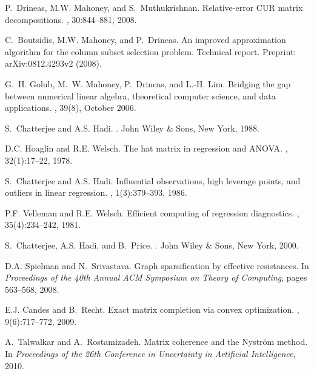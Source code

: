 \documentclass[twoside]{article}
\begin{document}
\begin{small}
\begin{thebibliography}{100}
P.~Drineas, M.W. Mahoney, and S.~Muthukrishnan.
\newblock Relative-error {CUR} matrix decompositions.
, 30:844--881,
  2008.

C.~Boutsidis, M.W. Mahoney, and P.~Drineas.
\newblock An improved approximation algorithm for the column subset selection
  problem.
\newblock Technical report.
\newblock Preprint: arXiv:0812.4293v2 (2008).

G.~H. Golub, M.~W. Mahoney, P.~Drineas, and L.-H. Lim.
\newblock Bridging the gap between numerical linear algebra, theoretical
  computer science, and data applications.
, 39(8), October 2006.

S.~Chatterjee and A.S. Hadi.
.
\newblock John Wiley \& Sons, New York, 1988.

D.C. Hoaglin and R.E. Welsch.
\newblock The hat matrix in regression and {ANOVA}.
, 32(1):17--22, 1978.

S.~Chatterjee and A.S. Hadi.
\newblock Influential observations, high leverage points, and outliers in
  linear regression.
, 1(3):379--393, 1986.

P.F. Velleman and R.E. Welsch.
\newblock Efficient computing of regression diagnostics.
, 35(4):234--242, 1981.

S.~Chatterjee, A.S. Hadi, and B.~Price.
.
\newblock John Wiley \& Sons, New York, 2000.

D.A. Spielman and N.~Srivastava.
\newblock Graph sparsification by effective resistances.
\newblock In {\em Proceedings of the 40th Annual ACM Symposium on Theory of
  Computing}, pages 563--568, 2008.

E.J. Candes and B.~Recht.
\newblock Exact matrix completion via convex optimization.
, 9(6):717--772, 2009.

A.~Talwalkar and A.~Rostamizadeh.
\newblock Matrix coherence and the {N}ystr\"{o}m method.
\newblock In {\em Proceedings of the 26th Conference in Uncertainty in
  Artificial Intelligence}, 2010.


\end{thebibliography}
\end{small}
\end{document}
